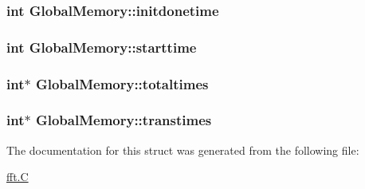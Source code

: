 \subsubsection[{initdonetime}]{\setlength{\rightskip}{0pt plus 5cm}int Global\+Memory\+::initdonetime}\label{structGlobalMemory_af5a01bd3e84a9eded90836059a8c8265}
\hypertarget{structGlobalMemory_acdb6d13712d999b9d0ee2699ae8e6742}{}
\subsubsection[{starttime}]{\setlength{\rightskip}{0pt plus 5cm}int Global\+Memory\+::starttime}\label{structGlobalMemory_acdb6d13712d999b9d0ee2699ae8e6742}
\hypertarget{structGlobalMemory_a65cad0bb3e74fa2529bf6d05970826e8}{}
\subsubsection[{totaltimes}]{\setlength{\rightskip}{0pt plus 5cm}int$\ast$ Global\+Memory\+::totaltimes}\label{structGlobalMemory_a65cad0bb3e74fa2529bf6d05970826e8}
\hypertarget{structGlobalMemory_a20ef09094978064a7a728f19746beba0}{}
\subsubsection[{transtimes}]{\setlength{\rightskip}{0pt plus 5cm}int$\ast$ Global\+Memory\+::transtimes}\label{structGlobalMemory_a20ef09094978064a7a728f19746beba0}


The documentation for this struct was generated from the following file\+:\begin{DoxyCompactItemize}
\item 
\hyperlink{fft_8C}{fft.\+C}\end{DoxyCompactItemize}
